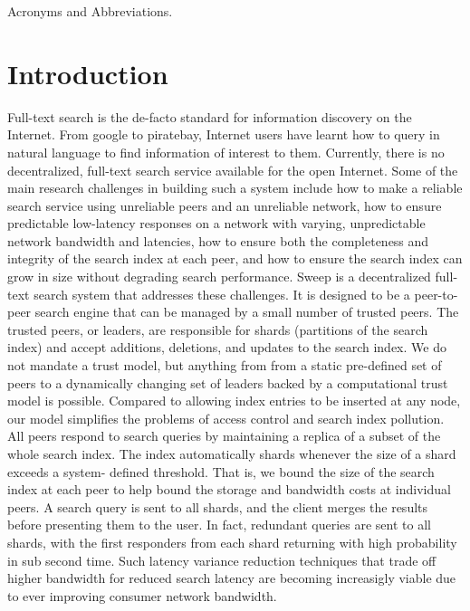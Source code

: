 \documentclass[12pt,a4paper,twoside,openright]{book}
\begin{document}
\tableofcontents

\listoffigures

\listoftables

\listoflistings


\renewcommand\abbreviationsname{List of Acronyms and Abbreviations}
\begin{abbreviations}
\label{list-of-acronyms-and-abbreviations}

Acronyms and Abbreviations.

\end{abbreviations}

\mainmatter
\setcounter{secnumdepth}{5} 
\chapter{Introduction}
\label{chap:introduction}
Full-text search is the de-facto standard for information discovery on the Internet. From google to piratebay, Internet users have learnt how to query in natural language to find information of interest to them. Currently, there is no decentralized, full-text search service available for the open Internet. Some of the main research challenges in building such a system include how to make a reliable search service using unreliable peers and an unreliable network, how to ensure predictable low-latency responses on a network with varying, unpredictable network bandwidth and latencies, how to ensure both the completeness and integrity of the search index at each peer, and how to ensure the search index can grow in size without degrading search performance. Sweep is a decentralized full-text search system that addresses these challenges. It is designed to be a peer-to-peer search engine that can be managed by a small number of trusted peers. The trusted peers, or leaders, are responsible for shards (partitions of the search index) and accept additions, deletions, and updates to the search index. We do not mandate a trust model, but anything from from a static pre-defined set of peers to a dynamically changing set of leaders backed by a computational trust model is possible. Compared to allowing index entries to be inserted at any node, our model simplifies the problems of access control and search index pollution. All peers respond to search queries by maintaining a replica of a subset of the whole search index. The index automatically shards whenever the size of a shard exceeds a system- defined threshold. That is, we bound the size of the search index at each peer to help bound the storage and bandwidth costs at individual peers. A search query is sent to all shards, and the client merges the results before presenting them to the user. In fact, redundant queries are sent to all shards, with the first responders from each shard returning with high probability in sub second time. Such latency variance reduction techniques that trade off higher bandwidth for reduced search latency are becoming increasigly viable due to ever improving consumer network bandwidth.
\end{document}
